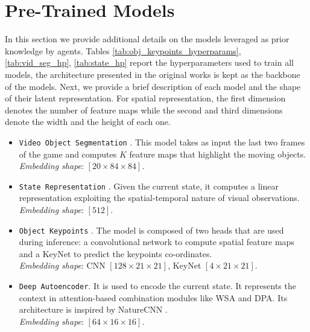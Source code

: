 
\section{Pre-Trained Models}\label{sec:app-models}
In this section we provide additional details on the models leveraged as prior knowledge by agents. 
Tables \ref{tab:obj_keypoints_hyperparams}, \ref{tab:vid_seg_hp}, \ref{tab:state_hp} report the hyperparameters used to train all models, the architecture presented in the original works is kept as the backbone of the models. 
Next, we provide a brief description of each model and the shape of their latent representation.
For spatial representation, the first dimension denotes the number of feature maps while the second and third dimensions denote the width and the height of each one.

\begin{itemize}
    \item \texttt{Video Object Segmentation} \citep{goel2018unsupervised}. This model takes as input the last two frames of the game and computes $K$ feature maps that highlight the moving objects. \\
    \textit{Embedding shape}: $[ 20 \times 84 \times 84 ]$.
    \item \texttt{State Representation} \citep{anand2019unsupervised}. Given the current state, it computes a linear representation exploiting the spatial-temporal nature of visual observations.\\
    \textit{Embedding shape}: $[512]$.
    \item \texttt{Object Keypoints} \citep{kulkarni2019unsupervised}. The model is composed of two heads that are used during inference: a convolutional network to compute spatial feature maps and a KeyNet \citep{jakab2018keynet} to predict the keypoints co-ordinates.\\
    \textit{Embedding shape}: CNN $[ 128 \times 21 \times 21 ]$, KeyNet $[ 4 \times 21 \times 21 ]$.
    \item \texttt{Deep Autoencoder}. It is used to encode the current state. It represents the context in attention-based combination modules like WSA and DPA. Its architecture is inspired by NatureCNN \citep{mnih2015human}.\\
    \textit{Embedding shape}: $[ 64 \times 16 \times 16]$.
\end{itemize}

